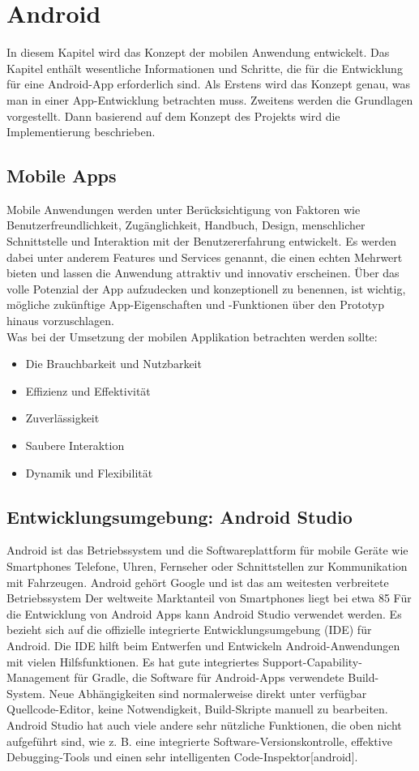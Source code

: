 \section{Android}

In diesem Kapitel wird das Konzept der mobilen Anwendung entwickelt. 
Das Kapitel enthält wesentliche Informationen und Schritte, die für die Entwicklung für eine Android-App erforderlich sind. 
Als Erstens wird das Konzept genau, was man in einer App-Entwicklung betrachten muss. Zweitens werden die Grundlagen vorgestellt.
Dann basierend auf dem Konzept des Projekts wird die Implementierung beschrieben.
\subsection{Mobile Apps}
Mobile Anwendungen werden unter Berücksichtigung von Faktoren wie Benutzerfreundlichkeit, Zugänglichkeit, Handbuch, Design, menschlicher Schnittstelle und Interaktion mit der Benutzererfahrung entwickelt. 
Es werden dabei unter anderem Features und Services genannt, die einen echten Mehrwert bieten und lassen die Anwendung attraktiv und innovativ erscheinen.
Über das volle Potenzial der App aufzudecken und konzeptionell zu benennen, ist wichtig, mögliche zukünftige App-Eigenschaften und -Funktionen über den Prototyp hinaus vorzuschlagen.\\
Was bei der Umsetzung der mobilen Applikation betrachten werden sollte:
\begin{itemize}
\item Die Brauchbarkeit und Nutzbarkeit 
\item Effizienz und Effektivität
\item Zuverlässigkeit
\item Saubere Interaktion
\item Dynamik und Flexibilität
\end{itemize}

\subsection{Entwicklungsumgebung: Android Studio}
Android ist das Betriebssystem und die Softwareplattform für mobile Geräte wie Smartphones
Telefone, Uhren, Fernseher oder Schnittstellen zur Kommunikation mit Fahrzeugen.
Android gehört Google und ist das am weitesten verbreitete Betriebssystem
Der weltweite Marktanteil von Smartphones liegt bei etwa 85 %
Für die Entwicklung von Android Apps kann Android Studio verwendet werden. 
Es bezieht sich auf die offizielle integrierte Entwicklungsumgebung (IDE) für Android. Die IDE hilft beim Entwerfen und Entwickeln Android-Anwendungen mit vielen Hilfsfunktionen. Es hat gute integriertes Support-Capability-Management für Gradle, die Software für Android-Apps verwendete Build-System. Neue Abhängigkeiten sind normalerweise direkt unter verfügbar Quellcode-Editor, keine Notwendigkeit, Build-Skripte manuell zu bearbeiten. 
Android Studio hat auch viele andere sehr nützliche Funktionen, die oben nicht aufgeführt sind, wie z. B. eine integrierte Software-Versionskontrolle, effektive Debugging-Tools und einen sehr intelligenten Code-Inspektor[android].
